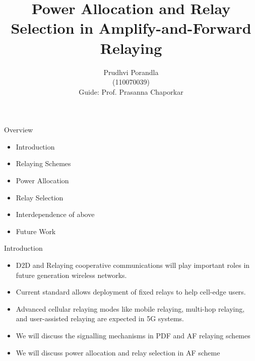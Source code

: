 \documentclass{beamer}
\title{Power Allocation and Relay Selection in
Amplify-and-Forward Relaying
}
\author{Prudhvi Porandla \\ \quad (110070039)\\
\vspace{2mm}
Guide: Prof. Prasanna Chaporkar}
\begin{document}
\begin{frame}
  \titlepage
\end{frame}

\begin{frame}{Overview}
  \begin{itemize}
  \item Introduction
  \vspace{3mm}
  \item Relaying Schemes 
  \vspace{3mm}
  \item Power Allocation
  \vspace{3mm}
  \item Relay Selection 
  \vspace{3mm}
  \item Interdependence of above
  \vspace{3mm}
  \item Future Work
  \end{itemize}
\end{frame}




\begin{frame}{Introduction}
  \begin{itemize}
  \item D2D and Relaying cooperative communications will play important roles in future generation wireless networks.
  \vspace{0.5cm}
  \item Current standard allows deployment of fixed relays to help cell-edge users. 
  \vspace{0.5cm}
  \item Advanced cellular relaying modes like mobile relaying, multi-hop relaying, 
	  and user-assisted relaying are expected in 5G systems.
		  \vspace{0.5cm}
  \item We will discuss the signalling mechanisms in PDF and AF relaying schemes 
\item  We will discuss power allocation and relay selection in AF scheme
  \end{itemize}
\end{frame}
\end{document}
